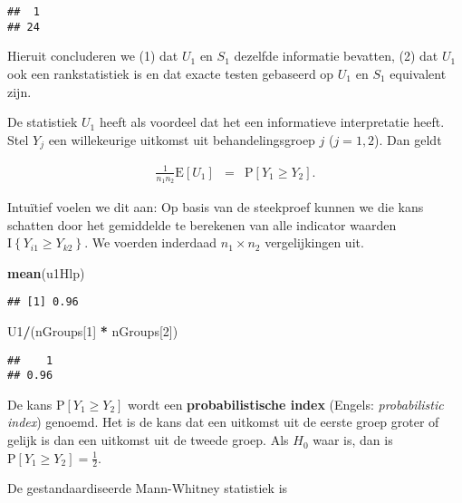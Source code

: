 \documentclass[
  12pt,dutch,coursenotes]{book}
\newenvironment{Shaded}{\begin{snugshade}}{\end{snugshade}}
\newcommand{\DecValTok}[1]{\textcolor[rgb]{0.00,0.00,0.81}{#1}}
\newcommand{\KeywordTok}[1]{\textcolor[rgb]{0.13,0.29,0.53}{\textbf{#1}}}
\newcommand{\NormalTok}[1]{#1}
\newcommand{\OperatorTok}[1]{\textcolor[rgb]{0.81,0.36,0.00}{\textbf{#1}}}
\newcommand{\StringTok}[1]{\textcolor[rgb]{0.31,0.60,0.02}{#1}}
\theoremstyle{definition}
\theoremstyle{definition}
\theoremstyle{definition}
\theoremstyle{remark}
\begin{document}
\begin{verbatim}
##  1 
## 24
\end{verbatim}

Hieruit concluderen we (1) dat \(U_1\) en \(S_1\) dezelfde informatie bevatten, (2) dat \(U_1\) ook een rankstatistiek is en dat exacte testen gebaseerd op \(U_1\) en \(S_1\) equivalent zijn.

De statistiek \(U_1\) heeft als voordeel dat het een informatieve interpretatie heeft.
Stel \(Y_j\) een willekeurige uitkomst uit behandelingsgroep \(j\) (\(j=1,2\)). Dan geldt

\begin{eqnarray*}
  \frac{1}{n_1n_2}\text{E}\left[U_1\right]
     &=& \text{P}\left[Y_1 \geq Y_2\right].
\end{eqnarray*}

Intuïtief voelen we dit aan: Op basis van de steekproef kunnen we die kans schatten door het gemiddelde te berekenen van alle indicator waarden \(\text{I}\left\{Y_{i1}\geq Y_{k2}\right\}\).
We voerden inderdaad \(n_1 \times n_2\) vergelijkingen uit.

\begin{Shaded}
\begin{Highlighting}[]
\KeywordTok{mean}\NormalTok{(u1Hlp)}
\end{Highlighting}
\end{Shaded}

\begin{verbatim}
## [1] 0.96
\end{verbatim}

\begin{Shaded}
\begin{Highlighting}[]
\NormalTok{U1}\OperatorTok{/}\NormalTok{(nGroups[}\DecValTok{1}\NormalTok{] }\OperatorTok{*}\StringTok{ }\NormalTok{nGroups[}\DecValTok{2}\NormalTok{])}
\end{Highlighting}
\end{Shaded}

\begin{verbatim}
##    1 
## 0.96
\end{verbatim}

De kans \(\text{P}\left[Y_1 \geq Y_2\right]\) wordt een \textbf{probabilistische index} (Engels: \emph{probabilistic index}) genoemd.
Het is de kans dat een uitkomst uit de eerste groep groter of gelijk is dan een uitkomst uit de tweede groep.
Als \(H_0\) waar is, dan is \(\text{P}\left[Y_1 \geq Y_2\right]=\frac{1}{2}\).

De gestandaardiseerde Mann-Whitney statistiek is
\end{document}
